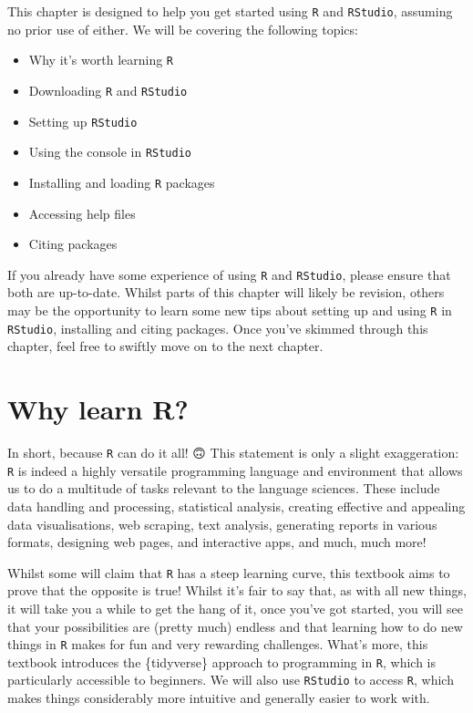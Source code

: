 \documentclass[
  letterpaper,
  DIV=11,
  numbers=noendperiod]{scrreprt}
\providecommand{\tightlist}{%
  \setlength{\itemsep}{0pt}\setlength{\parskip}{0pt}}\usepackage{longtable,booktabs,array}
\begin{document}
This chapter is designed to help you get started using \texttt{R} and
\texttt{RStudio}, assuming no prior use of either. We will be covering
the following topics:

\begin{itemize}
\tightlist
\item
  Why it's worth learning \texttt{R}
\item
  Downloading \texttt{R} and \texttt{RStudio}
\item
  Setting up \texttt{RStudio}
\item
  Using the console in \texttt{RStudio}
\item
  Installing and loading \texttt{R} packages
\item
  Accessing help files
\item
  Citing packages
\end{itemize}

If you already have some experience of using \texttt{R} and
\texttt{RStudio}, please ensure that both are up-to-date. Whilst parts
of this chapter will likely be revision, others may be the opportunity
to learn some new tips about setting up and using \texttt{R} in
\texttt{RStudio}, installing and citing packages. Once you've skimmed
through this chapter, feel free to swiftly move on to the next chapter.

\section{Why learn R?}\label{why-learn-r}

In short, because \texttt{R} can do it all! 🙃 This statement is only a
slight exaggeration: \texttt{R} is indeed a highly versatile programming
language and environment that allows us to do a multitude of tasks
relevant to the language sciences. These include data handling and
processing, statistical analysis, creating effective and appealing data
visualisations, web scraping, text analysis, generating reports in
various formats, designing web pages, and interactive apps, and much,
much more! 💪

Whilst some will claim that \texttt{R} has a steep learning curve, this
textbook aims to prove that the opposite is true! Whilst it's fair to
say that, as with all new things, it will take you a while to get the
hang of it, once you've got started, you will see that your
possibilities are (pretty much) endless and that learning how to do new
things in \texttt{R} makes for fun and very rewarding challenges. What's
more, this textbook introduces the \{tidyverse\} approach to programming
in \texttt{R}, which is particularly accessible to beginners. We will
also use \texttt{RStudio} to access \texttt{R}, which makes things
considerably more intuitive and generally easier to work with.
\end{document}
